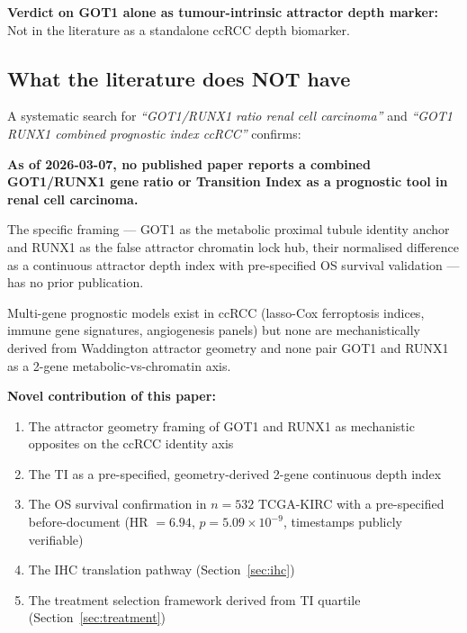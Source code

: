 \documentclass[11pt, a4paper]{article}
\begin{document}
\textbf{Verdict on GOT1 alone as
tumour-intrinsic attractor depth marker:}
Not in the literature as a standalone
ccRCC depth biomarker.

\subsection{What the literature does NOT have}

A systematic search for
\textit{``GOT1/RUNX1 ratio renal cell
carcinoma''} and \textit{``GOT1 RUNX1
combined prognostic index ccRCC''} confirms:

\begin{mdframed}[backgroundcolor=novelbox,
                 linecolor=purple!50!black,
                 linewidth=1pt]
\textbf{As of 2026-03-07, no published paper
reports a combined GOT1/RUNX1 gene ratio or
Transition Index as a prognostic tool in
renal cell carcinoma.}

The specific framing --- GOT1 as the metabolic
proximal tubule identity anchor and RUNX1 as
the false attractor chromatin lock hub, their
normalised difference as a continuous attractor
depth index with pre-specified OS survival
validation --- has no prior publication.

Multi-gene prognostic models exist in ccRCC
(lasso-Cox ferroptosis indices, immune gene
signatures, angiogenesis panels) but none
are mechanistically derived from Waddington
attractor geometry and none pair GOT1 and
RUNX1 as a 2-gene metabolic-vs-chromatin
axis.
\end{mdframed}

\textbf{Novel contribution of this paper:}
\begin{enumerate}
    \item The attractor geometry framing of
    GOT1 and RUNX1 as mechanistic opposites
    on the ccRCC identity axis
    \item The TI as a pre-specified,
    geometry-derived 2-gene continuous
    depth index
    \item The OS survival confirmation in
    $n = 532$ TCGA-KIRC with a
    pre-specified before-document
    (HR $= 6.94$, $p = 5.09 \times
    10^{-9}$, timestamps publicly verifiable)
    \item The IHC translation pathway
    (Section~\ref{sec:ihc})
    \item The treatment selection framework
    derived from TI quartile (Section~\ref{sec:treatment})
\end{enumerate}
\end{document}
